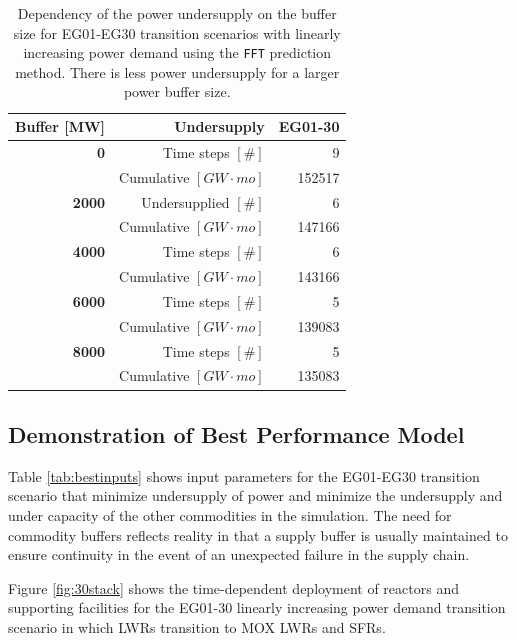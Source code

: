 \begin{table}[h]
    \centering
    \doublespacing
	\caption{Dependency of the power undersupply on the buffer size 
	for EG01-EG30 transition scenarios with linearly 
    increasing power demand using the \texttt{FFT} prediction method.
    There is less power undersupply for a larger power buffer size.}
	\label{tab:buff_size}
	\small
	\begin{tabular}{rrr}
                \hline
                \textbf{Buffer [MW]}     & \textbf{Undersupply}               & \textbf{EG01-30} \\
		\hline
		\textbf{0}             & Time steps $[\#]$  & 9\\  
                      & Cumulative $[GW\cdot mo]$    & 152517 \\ \hline
        \textbf{2000}          & Undersupplied $[\#]$ & 6 \\  
        	      & Cumulative $[GW\cdot mo]$   & 147166 \\ \hline
        \textbf{4000}         & Time steps $[\#]$ & 6 \\  
				  & Cumulative $[GW\cdot mo]$     & 143166 \\ \hline
        \textbf{6000}          & Time steps $[\#]$  & 5 \\  
		& Cumulative $[GW\cdot mo]$     & 139083 \\ \hline
        \textbf{8000}          & Time steps $[\#]$  & 5  \\  
	              & Cumulative $[GW\cdot mo]$  & 135083 \\ \hline
	\end{tabular}
\end{table}

\subsection{Demonstration of Best Performance Model}
Table \ref{tab:bestinputs} 
shows \deploy input parameters for the 
EG01-EG30 transition scenario
that minimize undersupply of power and minimize 
the undersupply and under capacity of the other commodities
in the simulation. 
The need for commodity buffers reflects reality
in that a supply buffer is usually maintained to ensure 
continuity in the event of an unexpected failure in the supply chain.

Figure \ref{fig:30stack} shows the
time-dependent deployment of reactors and supporting facilities 
for the EG01-30 linearly increasing power demand 
transition scenario in which \glspl{LWR} transition to 
\gls{MOX} \glspl{LWR} and \glspl{SFR}.

